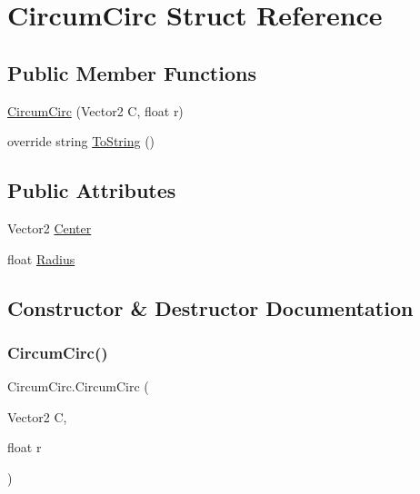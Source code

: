 \hypertarget{struct_circum_circ}{}\section{Circum\+Circ Struct Reference}
\label{struct_circum_circ}
\subsection*{Public Member Functions}
\begin{DoxyCompactItemize}
\item 
\mbox{\hyperlink{struct_circum_circ_ada56c128b52d0eabfc4ef19de0490589}{Circum\+Circ}} (Vector2 C, float r)
\item 
override string \mbox{\hyperlink{struct_circum_circ_ae51a3357893dd35882d55c01e8784d21}{To\+String}} ()
\end{DoxyCompactItemize}
\subsection*{Public Attributes}
\begin{DoxyCompactItemize}
\item 
Vector2 \mbox{\hyperlink{struct_circum_circ_ac0b08155df88d5ebfe7970e94bba4adf}{Center}}
\item 
float \mbox{\hyperlink{struct_circum_circ_a135edc470aa3698901aad8e662c43f02}{Radius}}
\end{DoxyCompactItemize}


\subsection{Constructor \& Destructor Documentation}
\mbox{\label{struct_circum_circ_ada56c128b52d0eabfc4ef19de0490589}} 
\subsubsection{\texorpdfstring{Circum\+Circ()}{CircumCirc()}}
{\footnotesize\ttfamily Circum\+Circ.\+Circum\+Circ (\begin{DoxyParamCaption}\item[{Vector2}]{C,  }\item[{float}]{r }\end{DoxyParamCaption})}



